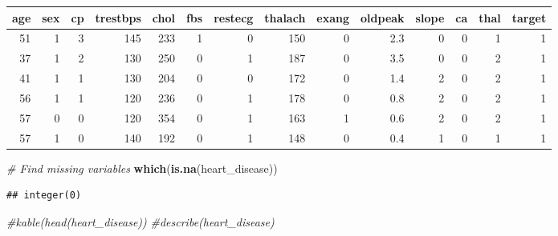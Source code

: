 \documentclass[]{article}
\newenvironment{Shaded}{\begin{snugshade}}{\end{snugshade}}
\newcommand{\KeywordTok}[1]{\textcolor[rgb]{0.13,0.29,0.53}{\textbf{#1}}}
\newcommand{\CommentTok}[1]{\textcolor[rgb]{0.56,0.35,0.01}{\textit{#1}}}
\newcommand{\NormalTok}[1]{#1}
\begin{document}
\begin{longtable}[]{@{}rrrrrrrrrrrrrr@{}}
\toprule
age & sex & cp & trestbps & chol & fbs & restecg & thalach & exang &
oldpeak & slope & ca & thal & target\tabularnewline
\midrule
\endhead
51 & 1 & 3 & 145 & 233 & 1 & 0 & 150 & 0 & 2.3 & 0 & 0 & 1 &
1\tabularnewline
37 & 1 & 2 & 130 & 250 & 0 & 1 & 187 & 0 & 3.5 & 0 & 0 & 2 &
1\tabularnewline
41 & 1 & 1 & 130 & 204 & 0 & 0 & 172 & 0 & 1.4 & 2 & 0 & 2 &
1\tabularnewline
56 & 1 & 1 & 120 & 236 & 0 & 1 & 178 & 0 & 0.8 & 2 & 0 & 2 &
1\tabularnewline
57 & 0 & 0 & 120 & 354 & 0 & 1 & 163 & 1 & 0.6 & 2 & 0 & 2 &
1\tabularnewline
57 & 1 & 0 & 140 & 192 & 0 & 1 & 148 & 0 & 0.4 & 1 & 0 & 1 &
1\tabularnewline
\bottomrule
\end{longtable}

\begin{Shaded}
\begin{Highlighting}[]
\CommentTok{# Find missing variables}
\KeywordTok{which}\NormalTok{(}\KeywordTok{is.na}\NormalTok{(heart_disease))}
\end{Highlighting}
\end{Shaded}

\begin{verbatim}
## integer(0)
\end{verbatim}

\begin{Shaded}
\begin{Highlighting}[]
\CommentTok{#kable(head(heart_disease))}
\CommentTok{#describe(heart_disease)}
\end{Highlighting}
\end{Shaded}
\end{document}
